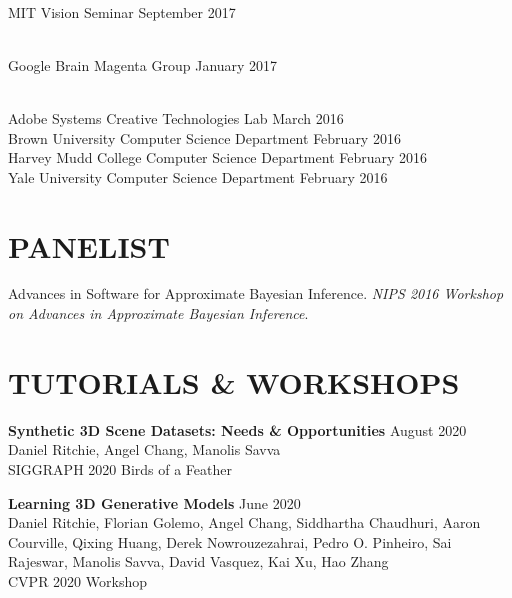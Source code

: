 \documentclass[line,margin]{res}
\begin{document}
\begin{resume}
\\
\talk
	{MIT}
	{Vision Seminar}
	{September 2017}

\\
\talk
	{Google Brain}
	{Magenta Group}
	{January 2017}

\\
\talk
	{Adobe Systems}
	{Creative Technologies Lab}
	{March 2016}\\
\talk
	{Brown University}
	{Computer Science Department}
	{February 2016}\\
\talk
	{Harvey Mudd College}
	{Computer Science Department}
	{February 2016}\\
\talk
	{Yale University}
	{Computer Science Department}
	{February 2016}


\section{PANELIST}

\newcommand{\panelist}[2]{
	#1. \emph{#2}.
}

\panelist{Advances in Software for Approximate Bayesian Inference}{NIPS 2016 Workshop on Advances in Approximate Bayesian Inference}


\section{TUTORIALS \& WORKSHOPS}

\newcommand{\tutorial}[4] {
	\textbf{#1} \hfill #4\\
	#2\\
	#3
}
\newcommand{\workshop}[4] {
	\textbf{#1} \hfill #4\\
	#2\\
	#3
}

\workshop
{Synthetic 3D Scene Datasets: Needs \& Opportunities}
{Daniel Ritchie, Angel Chang, Manolis Savva}
{SIGGRAPH 2020 Birds of a Feather}
{August 2020}


\workshop
{Learning 3D Generative Models}
{Daniel Ritchie, Florian Golemo, Angel Chang, Siddhartha Chaudhuri, Aaron Courville, Qixing Huang, Derek Nowrouzezahrai, Pedro O. Pinheiro, Sai Rajeswar, Manolis Savva, David Vasquez, Kai Xu, Hao Zhang}
{CVPR 2020 Workshop}
{June 2020}


\end{resume}
\end{document}
